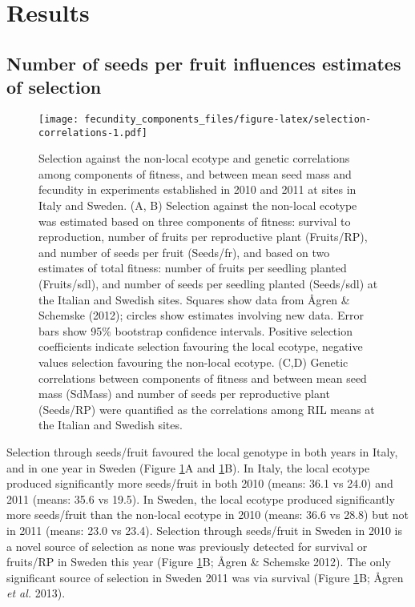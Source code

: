 \documentclass[
]{article}
\begin{document}
\hypertarget{results}{%
\section{Results}\label{results}}

\hypertarget{number-of-seeds-per-fruit-influences-estimates-of-selection}{%
\subsection{Number of seeds per fruit influences estimates of selection}\label{number-of-seeds-per-fruit-influences-estimates-of-selection}}

\begin{figure}
\centering
\texttt{[image: fecundity\_components\_files/figure-latex/selection-correlations-1.pdf]}
\caption{\label{fig:selection-correlations}Selection against the non-local ecotype and genetic correlations among components of fitness, and between mean seed mass and fecundity in experiments established in 2010 and 2011 at sites in Italy and Sweden. (A, B) Selection against the non-local ecotype was estimated based on three components of fitness: survival to reproduction, number of fruits per reproductive plant (Fruits/RP), and number of seeds per fruit (Seeds/fr), and based on two estimates of total fitness: number of fruits per seedling planted (Fruits/sdl), and number of seeds per seedling planted (Seeds/sdl) at the Italian and Swedish sites. Squares show data from Ågren \& Schemske (2012); circles show estimates involving new data. Error bars show 95\% bootstrap confidence intervals. Positive selection coefficients indicate selection favouring the local ecotype, negative values selection favouring the non-local ecotype. (C,D) Genetic correlations between components of fitness and between mean seed mass (SdMass) and number of seeds per reproductive plant (Seeds/RP) were quantified as the correlations among RIL means at the Italian and Swedish sites.}
\end{figure}

Selection through seeds/fruit favoured the local genotype in both years in Italy, and in one year in Sweden (Figure \ref{fig:selection-correlations}A and \ref{fig:selection-correlations}B).
In Italy, the local ecotype produced significantly more seeds/fruit in both 2010
(means:
36.1
vs
24.0)
and 2011 (means:
35.6
vs
19.5).
In Sweden, the local ecotype produced significantly more seeds/fruit than the non-local ecotype in 2010 (means:
36.6
vs
28.8)
but not in 2011 (means:
23.0
vs
23.4).
Selection through seeds/fruit in Sweden in 2010 is a novel source of selection as none was previously detected for survival or fruits/RP in Sweden this year (Figure \ref{fig:selection-correlations}B; Ågren \& Schemske 2012). The only significant source of selection in Sweden 2011 was via survival (Figure \ref{fig:selection-correlations}B; Ågren \emph{et al.} 2013).
\end{document}
